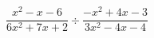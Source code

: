 \hspace*{2mm}\begin{minipage}[t]{\dimexpr\linewidth-2mm\relax}\vspace{0pt}
$\dfrac{x^2-x-6}{6x^2+7x+2}\div\dfrac{-x^2+4x-3}{3x^2-4x-4}$\end{minipage}
